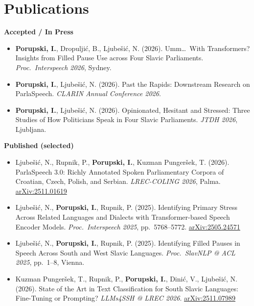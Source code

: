 \documentclass[10pt, a4paper]{article}
\begin{document}
\section{Publications}

\textbf{Accepted / In Press}
\begin{itemize}
  \item \textbf{Porupski, I.}, Dropuljić, B., Ljubešić, N. (2026).
        Umm\ldots\ With Transformers? Insights from Filled Pause Use across Four Slavic
        Parliaments. \textit{Proc.\ Interspeech 2026}, Sydney.

  \item \textbf{Porupski, I.}, Ljubešić, N. (2026).
        Past the Rapids: Downstream Research on ParlaSpeech.
        \textit{CLARIN Annual Conference 2026}.

  \item \textbf{Porupski, I.}, Ljubešić, N. (2026).
        Opinionated, Hesitant and Stressed: Three Studies of How Politicians Speak in Four
        Slavic Parliaments. \textit{JTDH 2026}, Ljubljana.
\end{itemize}

\textbf{Published (selected)}
\begin{itemize}
  \item Ljubešić, N., Rupnik, P., \textbf{Porupski, I.}, Kuzman Pungeršek, T. (2026).
        ParlaSpeech 3.0: Richly Annotated Spoken Parliamentary Corpora of Croatian, Czech,
        Polish, and Serbian. \textit{LREC-COLING 2026}, Palma.
        \href{https://arxiv.org/abs/2511.01619}{arXiv:2511.01619}

  \item Ljubešić, N., \textbf{Porupski, I.}, Rupnik, P. (2025).
        Identifying Primary Stress Across Related Languages and Dialects with
        Transformer-based Speech Encoder Models.
        \textit{Proc.\ Interspeech 2025}, pp.\ 5768–5772.
        \href{https://arxiv.org/abs/2505.24571}{arXiv:2505.24571}

  \item Ljubešić, N., \textbf{Porupski, I.}, Rupnik, P. (2025).
        Identifying Filled Pauses in Speech Across South and West Slavic Languages.
        \textit{Proc.\ SlavNLP @ ACL 2025}, pp.\ 1–8, Vienna.

  \item Kuzman Pungeršek, T., Rupnik, P., \textbf{Porupski, I.}, Dinić, V., Ljubešić, N.
        (2026). State of the Art in Text Classification for South Slavic Languages:
        Fine-Tuning or Prompting? \textit{LLMs4SSH @ LREC 2026}.
        \href{https://arxiv.org/abs/2511.07989}{arXiv:2511.07989}
\end{itemize}
\end{document}
